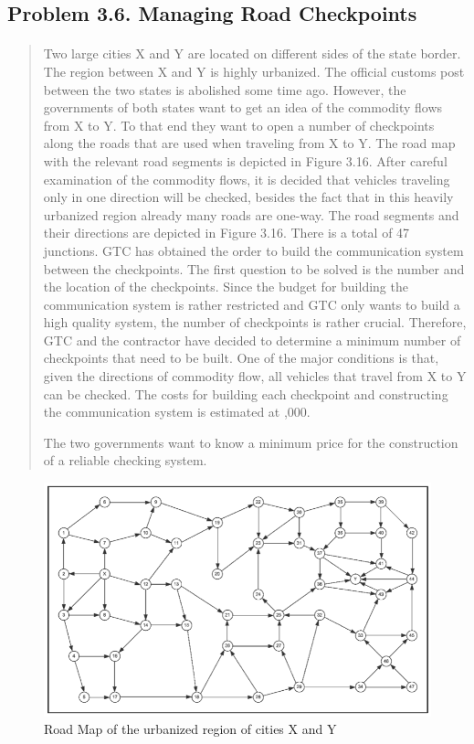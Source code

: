 \subsection{Problem 3.6. Managing Road Checkpoints}

\paragraph{}
\begin{quote}
Two large cities X and Y are located on different sides of the state border. The region between X and Y is highly urbanized. The official customs post between the two states is abolished some time ago. However, the governments of both states want to get an idea of the commodity flows from X to Y. To that end they want to open a number of checkpoints along the roads that are used when traveling from X to Y. The road map with the relevant road segments is depicted in Figure 3.16. After careful examination of the commodity flows, it is decided that vehicles traveling only in one direction will be checked, besides the fact that in this heavily urbanized region already many roads are one-way. The road segments and their directions are depicted in Figure 3.16. There is a total of 47 junctions. GTC has obtained the order to build the communication system between the checkpoints. The first question to be solved is the number and the location of the checkpoints. Since the budget for building the communication system is rather restricted and GTC only wants to build a high quality system, the number of checkpoints is rather crucial. Therefore, GTC and the contractor have decided to determine a minimum number of checkpoints that need to be built. One of the major conditions is that, given the directions of commodity flow, all vehicles that travel from X to Y can be checked. The costs for building each checkpoint and constructing the communication system is estimated at ,000.

The two governments want to know a minimum price for the construction of a reliable checking system.
\end{quote}

\begin{figure}[H]
	\centering
	\includegraphics[scale=1]{./img/figure3-16.png}
	\caption{Road Map of the urbanized region of cities X and Y}
	\label{network3-6}
\end{figure}

